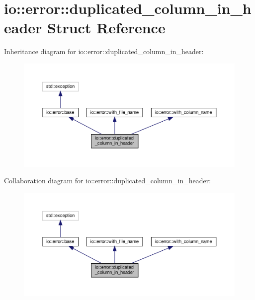 \hypertarget{structio_1_1error_1_1duplicated__column__in__header}{}\section{io\+:\+:error\+:\+:duplicated\+\_\+column\+\_\+in\+\_\+header Struct Reference}
\label{structio_1_1error_1_1duplicated__column__in__header}


Inheritance diagram for io\+:\+:error\+:\+:duplicated\+\_\+column\+\_\+in\+\_\+header\+:\nopagebreak
\begin{figure}[H]
\begin{center}
\leavevmode
\includegraphics[width=350pt]{structio_1_1error_1_1duplicated__column__in__header__inherit__graph}
\end{center}
\end{figure}


Collaboration diagram for io\+:\+:error\+:\+:duplicated\+\_\+column\+\_\+in\+\_\+header\+:\nopagebreak
\begin{figure}[H]
\begin{center}
\leavevmode
\includegraphics[width=350pt]{structio_1_1error_1_1duplicated__column__in__header__coll__graph}
\end{center}
\end{figure}

